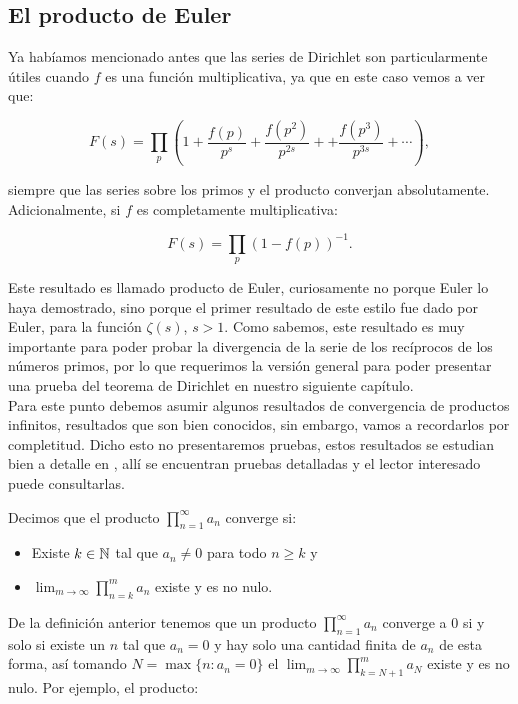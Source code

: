 \subsection{El producto de Euler}

Ya habíamos mencionado antes que las series de Dirichlet son particularmente útiles cuando $f$ es una función multiplicativa, ya que en este caso vemos a ver que:

$$
F(s)=\prod_p\left(1+\frac{f(p)}{p^s}+\frac{f\left(p^2\right)}{p^{2 s}}++\frac{f\left(p^3\right)}{p^{3 s}}+\cdots\right),
$$

siempre que las series sobre los primos y el producto converjan absolutamente. Adicionalmente, si $f$ es completamente multiplicativa:

$$F(s)=\prod_p(1-f(p))^{-1}.$$

Este resultado es llamado producto de Euler, curiosamente no porque Euler lo haya demostrado, sino porque el primer resultado de este estilo fue dado por Euler, para la función $\zeta(s)$, $s>1$. Como sabemos, este resultado es muy importante para  poder probar la divergencia de la serie de los recíprocos de los números primos, por lo que requerimos la versión general para  poder presentar una prueba del teorema de Dirichlet en nuestro siguiente capítulo.\\


Para este punto debemos asumir algunos resultados de convergencia de productos infinitos, resultados que son bien conocidos, sin embargo, vamos a recordarlos por completitud. Dicho esto no presentaremos pruebas, estos resultados se estudian bien a detalle en \cite{Apostol:105425}, allí se encuentran pruebas detalladas y el lector interesado puede consultarlas.

\begin{definition}
Decimos que el producto $\displaystyle \prod_{n=1}^{\infty} a_n$ converge si:
\begin{itemize}[label=$\bullet$]
\item Existe $k\in \mathbb{N}$ tal que $a_n\neq 0$ para todo $n\geq k$ y
\item $\displaystyle\lim_{m \to \infty} \prod_{n=k}^{m}a_n$ existe y es  no nulo.
\end{itemize}
\end{definition}

De la definición anterior tenemos que un producto $\displaystyle\prod_{n=1}^{\infty} a_n$ converge a 0 si y solo si existe un $n$ tal que $a_n=0$ y hay solo una cantidad finita de $a_n$ de esta forma, así tomando $N=\max\{n: a_n=0\}$ el $\lim_{m \to \infty} \displaystyle\prod_{k=N+1}^{m}a_N$ existe y es no nulo. Por ejemplo, el producto:

